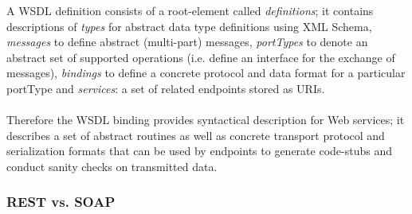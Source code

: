 A WSDL definition consists of a root-element called \emph{definitions}; it contains descriptions of \emph{types} for abstract data type definitions using XML Schema, \emph{messages} to define abstract (multi-part) messages, \emph{portTypes} to denote an abstract set of supported operations (i.e. define an interface for the exchange of messages), \emph{bindings} to define a concrete protocol and data format for a particular portType and \emph{services}: a set of related endpoints stored as URIs.
\\ \\
Therefore the WSDL binding provides syntactical description for Web services; it describes a set of abstract routines as well as concrete transport protocol and serialization formats that can be used by endpoints to generate code-stubs and conduct sanity checks on transmitted data. \cite{BIGREST}

\subsubsection*{REST vs. SOAP}

